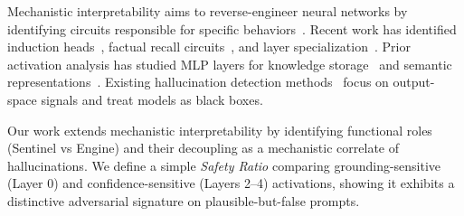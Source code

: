 Mechanistic interpretability aims to reverse-engineer neural networks by identifying circuits responsible for specific behaviors~\cite{olah2020zoom}. Recent work has identified induction heads~\cite{olsson2022context}, factual recall circuits~\cite{meng2022locating}, and layer specialization~\cite{tenney2019bert}. Prior activation analysis has studied MLP layers for knowledge storage~\cite{geva2021transformer} and semantic representations~\cite{elhage2022toy}. Existing hallucination detection methods~\cite{manakul2023selfcheckgpt,kuhn2023semantic} focus on output-space signals and treat models as black boxes.

Our work extends mechanistic interpretability by identifying functional roles (Sentinel vs Engine) and their decoupling as a mechanistic correlate of hallucinations. We define a simple \emph{Safety Ratio} comparing grounding-sensitive (Layer 0) and confidence-sensitive (Layers 2--4) activations, showing it exhibits a distinctive adversarial signature on plausible-but-false prompts.

